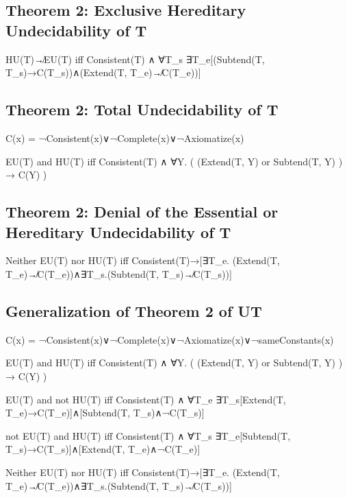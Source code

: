 \hypertarget{theorem-2-exclusive-hereditary-undecidability-of-t}{%
\subsection{Theorem 2: Exclusive Hereditary Undecidability of
T}\label{theorem-2-exclusive-hereditary-undecidability-of-t}}

HU(T)↛EU(T) iff Consistent(T) ∧ ∀T\_s ∃T\_e{[}(Subtend(T,
T\_s)→C(T\_s))∧(Extend(T, T\_e)↛C(T\_e)){]}

\hypertarget{theorem-2-total-undecidability-of-t}{%
\subsection{Theorem 2: Total Undecidability of
T}\label{theorem-2-total-undecidability-of-t}}

C(x) = ¬Consistent(x)∨¬Complete(x)∨¬Axiomatize(x)

EU(T) and HU(T) iff Consistent(T) ∧ ∀Y. ( (Extend(T, Y) or Subtend(T, Y)
) → C(Y) )

\hypertarget{theorem-2-denial-of-the-essential-or-hereditary-undecidability-of-t}{%
\subsection{Theorem 2: Denial of the Essential or Hereditary
Undecidability of
T}\label{theorem-2-denial-of-the-essential-or-hereditary-undecidability-of-t}}

Neither EU(T) nor HU(T) iff Consistent(T)→{[}∃T\_e. (Extend(T,
T\_e)↛C(T\_e))∧∃T\_s.(Subtend(T, T\_s)↛C(T\_s)){]}

\hypertarget{generalization-of-theorem-2-of-ut}{%
\subsection{Generalization of Theorem 2 of
UT}\label{generalization-of-theorem-2-of-ut}}

C(x) = ¬Consistent(x)∨¬Complete(x)∨¬Axiomatize(x)∨¬sameConstants(x)

EU(T) and HU(T) iff Consistent(T) ∧ ∀Y. ( (Extend(T, Y) or Subtend(T, Y)
) → C(Y) )

EU(T) and not HU(T) iff Consistent(T) ∧ ∀T\_e ∃T\_s{[}Extend(T,
T\_e)→C(T\_e){]}∧{[}Subtend(T, T\_s)∧¬C(T\_s){]}

not EU(T) and HU(T) iff Consistent(T) ∧ ∀T\_s ∃T\_e{[}Subtend(T,
T\_s)→C(T\_s){]}∧{[}Extend(T, T\_e)∧¬C(T\_e){]}

Neither EU(T) nor HU(T) iff Consistent(T)→{[}∃T\_e. (Extend(T,
T\_e)↛C(T\_e))∧∃T\_s.(Subtend(T, T\_s)↛C(T\_s)){]}

